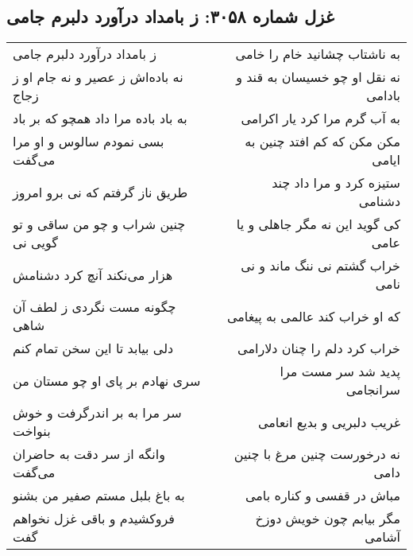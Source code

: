 \begin{center}
\section*{غزل شماره ۳۰۵۸: ز بامداد درآورد دلبرم جامی}
\label{sec:3058}
\begin{longtable}{l p{0.5cm} r}
ز بامداد درآورد دلبرم جامی
&&
به ناشتاب چشانید خام را خامی
\\
نه باده‌اش ز عصیر و نه جام او ز زجاج
&&
نه نقل او چو خسیسان به قند و بادامی
\\
به باد باده مرا داد همچو که بر باد
&&
به آب گرم مرا کرد یار اکرامی
\\
بسی نمودم سالوس و او مرا می‌گفت
&&
مکن مکن که کم افتد چنین به ایامی
\\
طریق ناز گرفتم که نی برو امروز
&&
ستیزه کرد و مرا داد چند دشنامی
\\
چنین شراب و چو من ساقی و تو گویی نی
&&
کی گوید این نه مگر جاهلی و یا عامی
\\
هزار می‌نکند آنچ کرد دشنامش
&&
خراب گشتم نی ننگ ماند و نی نامی
\\
چگونه مست نگردی ز لطف آن شاهی
&&
که او خراب کند عالمی به پیغامی
\\
دلی بیابد تا این سخن تمام کنم
&&
خراب کرد دلم را چنان دلارامی
\\
سری نهادم بر پای او چو مستان من
&&
پدید شد سر مست مرا سرانجامی
\\
سر مرا به بر اندرگرفت و خوش بنواخت
&&
غریب دلبریی و بدیع انعامی
\\
وانگه از سر دقت به حاضران می‌گفت
&&
نه درخورست چنین مرغ با چنین دامی
\\
به باغ بلبل مستم صفیر من بشنو
&&
مباش در قفسی و کناره بامی
\\
فروکشیدم و باقی غزل نخواهم گفت
&&
مگر بیابم چون خویش دوزخ آشامی
\\
\end{longtable}
\end{center}
